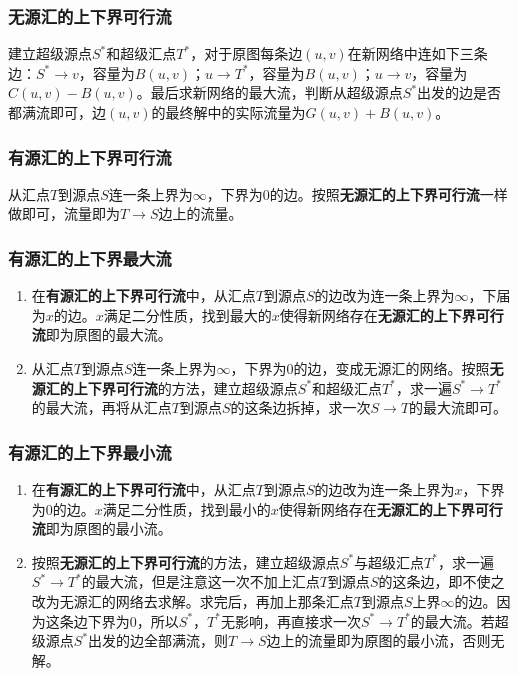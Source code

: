 \subsubsection{无源汇的上下界可行流}
建立超级源点$S^*$和超级汇点$T^*$，对于原图每条边$(u,v)$在新网络中连如下三条边：$S^* \rightarrow v$，容量为$B(u,v)$；$u \rightarrow T^*$，容量为$B(u,v)$；$u \rightarrow v$，容量为$C(u,v) - B(u,v)$。最后求新网络的最大流，判断从超级源点$S^*$出发的边是否都满流即可，边$(u,v)$的最终解中的实际流量为$G(u,v)+B(u,v)$。
\subsubsection{有源汇的上下界可行流}
从汇点$T$到源点$S$连一条上界为$\infty$，下界为$0$的边。按照\textbf{无源汇的上下界可行流}一样做即可，流量即为$T \rightarrow S$边上的流量。
\subsubsection{有源汇的上下界最大流}
\begin{enumerate}
	\item 在\textbf{有源汇的上下界可行流}中，从汇点$T$到源点$S$的边改为连一条上界为$\infty$，下届为$x$的边。$x$满足二分性质，找到最大的$x$使得新网络存在\textbf{无源汇的上下界可行流}即为原图的最大流。
	\item 从汇点$T$到源点$S$连一条上界为$\infty$，下界为$0$的边，变成无源汇的网络。按照\textbf{无源汇的上下界可行流}的方法，建立超级源点$S^*$和超级汇点$T^*$，求一遍$S^* \rightarrow T^*$的最大流，再将从汇点$T$到源点$S$的这条边拆掉，求一次$S \rightarrow T$的最大流即可。
\end{enumerate}
\subsubsection{有源汇的上下界最小流}
\begin{enumerate}
	\item 在\textbf{有源汇的上下界可行流}中，从汇点$T$到源点$S$的边改为连一条上界为$x$，下界为$0$的边。$x$满足二分性质，找到最小的$x$使得新网络存在\textbf{无源汇的上下界可行流}即为原图的最小流。
	\item 按照\textbf{无源汇的上下界可行流}的方法，建立超级源点$S^*$与超级汇点$T^*$，求一遍$S^* \rightarrow T^*$的最大流，但是注意这一次不加上汇点$T$到源点$S$的这条边，即不使之改为无源汇的网络去求解。求完后，再加上那条汇点$T$到源点$S$上界$\infty$的边。因为这条边下界为$0$，所以$S^*$，$T^*$无影响，再直接求一次$S^* \rightarrow T^*$的最大流。若超级源点$S^*$出发的边全部满流，则$T \rightarrow S$边上的流量即为原图的最小流，否则无解。
\end{enumerate}
